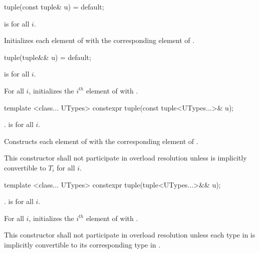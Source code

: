 %
\begin{itemdecl}
tuple(const tuple& u) = default;
\end{itemdecl}

\begin{itemdescr}
\pnum
\requires {} is  for all $i$.

\pnum
\effects Initializes each element of  with the
corresponding element of .
\end{itemdescr}

%
\begin{itemdecl}
tuple(tuple&& u) = default;
\end{itemdecl}

\begin{itemdescr}
\pnum
\requires {} is  for all $i$.

\pnum
\effects For all $i$, initializes the $i^{th}$ element of  with
.
\end{itemdescr}

%
\begin{itemdecl}
template <class... UTypes> constexpr tuple(const tuple<UTypes...>& u);
\end{itemdecl}

\begin{itemdescr}
\pnum
\requires
{} \tcode{==} .
 is  for all $i$.

\pnum
\effects  Constructs each element of  with the corresponding
element of .

\pnum
\remark This constructor shall not participate in overload resolution unless
 is implicitly convertible to $T_i$ for all $i$.
\end{itemdescr}

%
\begin{itemdecl}
template <class... UTypes> constexpr tuple(tuple<UTypes...>&& u);
\end{itemdecl}

\begin{itemdescr}
\pnum
\requires
{} \tcode{==} .
 is  for all $i$.

\pnum
\effects For all $i$, initializes the $i^{th}$ element of  with
.

\pnum
\remark This constructor shall not participate in overload resolution unless
each type in  is implicitly convertible to its corresponding type in
.
\end{itemdescr}

